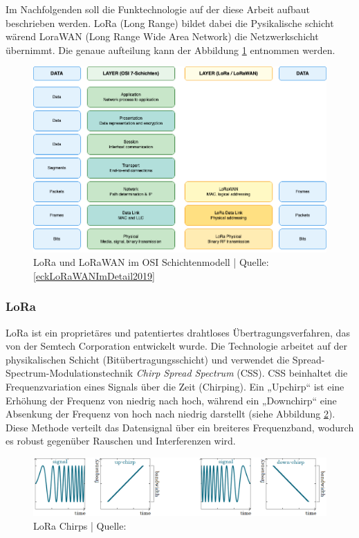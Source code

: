 Im Nachfolgenden soll die Funktechnologie auf der diese Arbeit aufbaut beschrieben werden. LoRa (Long Range) bildet dabei die Pysikalische schicht wärend LoraWAN (Long Range Wide Area Network) die Netzwerkschicht übernimmt. Die genaue aufteilung kann der Abbildung \ref{fig:lora-lorawan-osi} entnommen werden.

\begin{figure}[H]
\centering
\includegraphics[scale=.4]{figures/diagrams/LoraWAN_OSI.png}
\caption{LoRa und LoRaWAN im OSI Schichtenmodell | Quelle: \ref{eckLoRaWANImDetail2019}}
\label{fig:lora-lorawan-osi}
\end{figure}

\subsubsection*{LoRa}
LoRa ist ein proprietäres und patentiertes drahtloses Übertragungsverfahren, das von der Semtech Corporation entwickelt wurde. Die Technologie arbeitet auf der physikalischen Schicht (Bitübertragungsschicht) und verwendet die Spread-Spectrum-Modulationstechnik \textit{Chirp Spread Spectrum} (CSS). CSS beinhaltet die Frequenzvariation eines Signals über die Zeit (Chirping). Ein „Upchirp“ ist eine Erhöhung der Frequenz von niedrig nach hoch, während ein „Downchirp“ eine Absenkung der Frequenz von hoch nach niedrig darstellt (siehe Abbildung \ref{fig:lora-chirp}). Diese Methode verteilt das Datensignal über ein breiteres Frequenzband, wodurch es robust gegenüber Rauschen und Interferenzen wird. 

\begin{figure}[H]
\centering
\includegraphics[scale=.4]{figures/asstes/lora-chirps.png}
\caption{LoRa Chirps | Quelle: \cite{tulkaLoRaSpreadingFactor}}
\label{fig:lora-chirp}
\end{figure}

